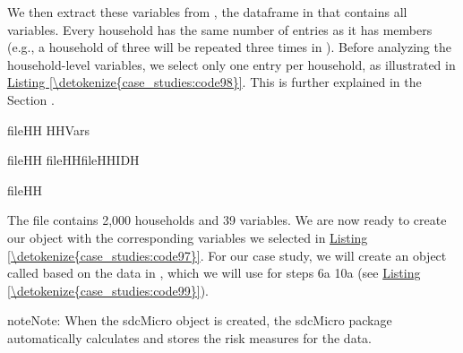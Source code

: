 \documentclass[letterpaper,10pt,english]{sphinxmanual}
\begin{document}
We then extract these variables from , the dataframe in  that
contains all variables. Every household has the same number of entries
as it has members (e.g., a household of three will be repeated three
times in ). Before analyzing the household-level variables, we
select only one entry per household, as illustrated in \hyperref[\detokenize{case_studies:code98}]{Listing \ref{\detokenize{case_studies:code98}}}. This
is further explained in the Section .

\def\sphinxLiteralBlockLabel{\label{\detokenize{case_studies:code98}}}
%
\begin{sphinxVerbatim}[commandchars=\\\{\},numbers=left,firstnumber=1,stepnumber=1]
fileHH  \PYG{p}{[}HHVars\PYG{p}{]}

fileHH  fileHH\PYG{p}{[}fileHHIDH\PYG{p}{]}

fileHH
\end{sphinxVerbatim}

The file  contains 2,000 households and 39 variables. We are now
ready to create our  object with the corresponding variables
we selected in \hyperref[\detokenize{case_studies:code97}]{Listing \ref{\detokenize{case_studies:code97}}}. For our case study, we will create an
 object called  based on the data in , which we
will use for steps 6a \textendash{} 10a (see \hyperref[\detokenize{case_studies:code99}]{Listing \ref{\detokenize{case_studies:code99}}}).

\begin{sphinxadmonition}{note}{Note:}
When the sdcMicro object is created, the sdcMicro package automatically calculates and
stores the risk measures for the data.
\end{sphinxadmonition}
\end{document}
